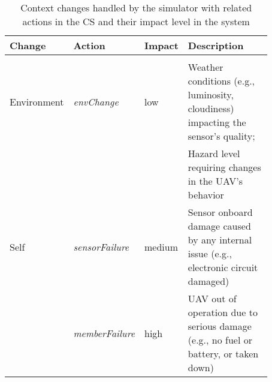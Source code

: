 \begin{table}[ht]
	\small
	\fontsize{10}{10}\selectfont
	\centering
	\caption{Context changes handled by the simulator with related actions in the CS and their impact level in the system}
	\label{table:context_changes}

	\begin{tabular}{p{0.16\linewidth}p{0.18\linewidth}p{0.1\linewidth}p{0.43\linewidth}}
	\hline
		 \textbf{Change}
		& \textbf{Action}
		& \textbf{Impact}
		& \textbf{Description}  \\ [1ex]
	\hline	\\ [-1ex] 
	Environment & \textit{envChange} & low & Weather conditions (e.g., luminosity, cloudiness) impacting the sensor's quality; \\[1ex]
	& & & Hazard level requiring changes in the UAV's behavior \\[5ex]
	Self & \textit{sensorFailure} & medium & Sensor onboard damage caused by any internal issue (e.g., electronic circuit damaged) \\[1ex]
	& \textit{memberFailure} & high & UAV out of operation due to serious damage (e.g., no fuel or battery, or taken down) \\[6ex]
	
	\hline
	\end{tabular}
\end{table} 
